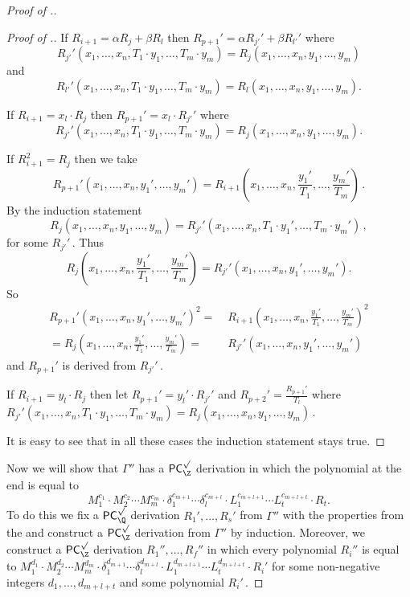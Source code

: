 \documentclass{toc}
\begin{document}
\begin{proof}[Proof of .]
\begin{proof}[Proof of .]
 If $R_{i + 1} = \alpha R_{j} + \beta R_l$ then $R_{p + 1}' = \alpha R_{j'}' + \beta R_{l'}'$ where 
$$
R_{j'}'(x_1, \ldots, x_n, T_1 \cdot y_1, \ldots, T_m \cdot y_m) = R_j(x_1, \ldots, x_n, y_1, \ldots, y_m)
$$ 
and 
$$
R_{l'}'(x_1, \ldots, x_n, T_1 \cdot y_1, \ldots, T_m \cdot y_m) = R_l(x_1, \ldots, x_n, y_1, \ldots, y_m).
$$ 

 If $R_{i + 1} = x_l \cdot R_j$ then $R_{p + 1}' = x_l \cdot R_{j'}'$ where 
$$
R_{j'}'(x_1, \ldots, x_n, T_1 \cdot y_1, \ldots, T_m \cdot y_m) = R_j(x_1, \ldots, x_n, y_1, \ldots, y_m).
$$ 

 If $R_{i + 1}^2 = R_j$ then we take 
$$
%
R_{p + 1}'(x_1, \ldots, x_n, y_1', \ldots, y_m') = R_{i + 1}(x_1, \ldots, x_n, \frac{y_1'}{T_1}, \ldots, \frac{y_m'}{T_m})\,. %
$$ By the induction statement  
$$
%
R_{j}(x_1, \ldots, x_n, y_1, \ldots, y_m) = R_{j'}'(x_1, \ldots, x_n, T_1 \cdot y_1', \ldots, T_m \cdot y_m')\,, %
$$
for some %
$R_{j'}'\,.$ %
 Thus
$$
R_{j}(x_1, \ldots, x_n, \frac{y_1'}{T_1}, \ldots, \frac{y_m'}{T_m}) = R_{j'}'(x_1, \ldots, x_n, y_1', \ldots,y_m').
$$
So 
\begin{align*}
    R_{p + 1}'(x_1, \ldots, x_n, y_1', \ldots, y_m')^2 =& \;R_{i + 1}(x_1, \ldots, x_n, \frac{y_1'}{T_1}, \ldots, \frac{y_m'}{T_m})^2  \\ = R_{j}(x_1, \ldots, x_n, \frac{y_1'}{T_1}, \ldots, \frac{y_m'}{T_m}) =&  \; R_{j'}'(x_1, \ldots, x_n, y_1', \ldots,y_m')
\end{align*}
and $R_{p + 1}'$ is derived from %
$R_{j'}'\,.$ %

 If $R_{i + 1} = y_l \cdot R_j$ then let $R_{p + 1}' = y_l' \cdot R_{j'}'$ and $R_{p + 2}' = \frac{R_{p + 1}'}{T_l}$ where %
$R_{j'}'(x_1, \ldots, x_n, T_1 \cdot y_1, \ldots, T_m \cdot y_m) = R_j(x_1, \ldots, x_n, y_1, \ldots, y_m)\,.$ %

%
It is easy to see that in all these cases the induction statement stays true. %
\end{proof}

Now we will show that $\Gamma''$ has a $\mathsf{PC}_{\Z}^{\surd}$ derivation in which the polynomial at %
the end is equal to 
$$
M_1^{c_1} \cdot M_2^{c_2} \cdots M_m^{c_m} \cdot \delta_1^{c_{m + 1}} \cdots \delta_l^{c_{m + l}} \cdot  L_1^{c_{m + l + 1}} \cdots L_t^{c_{m + l + t}}  \cdot R_t.
$$
To do this we fix a $\mathsf{PC}_{\Q}^{\surd}$ derivation %
$R_1', \ldots, R_s'$ %
 from $\Gamma''$ with the properties from the  and construct a $\mathsf{PC}_{\Z}^{\surd}$ derivation from $\Gamma''$ by induction. Moreover, we construct a $\mathsf{PC}_{\Z}^{\surd}$ derivation %
$R_1'', \ldots, R_f''$ %
 in which every polynomial $R_i''$ is equal to $M_1^{d_1} \cdot M_2^{d_2} \cdots M_m^{d_m} \cdot \delta_1^{d_{m + 1}} \cdots \delta_l^{d_{m + l}} \cdot  L_1^{d_{m + l + 1}} \cdots L_t^{d_{m + l + t}} \cdot R_i'$ for some non-negative integers $d_1, \ldots, d_{m + l + t}$ and some polynomial %
$R_i'\,.$ %


\end{proof}
\end{document}
